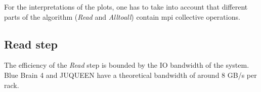 For the interpretations of the plots, one has to take into account that different parts of the algorithm
(\emph{Read} and \emph{Alltoall}) contain mpi collective operations.

\subsection{Read step}
\label{sec:speedup:load}
The efficiency of the \emph{Read} step is bounded by the IO bandwidth of the system.
Blue Brain 4 and JUQUEEN have a theoretical bandwidth of around $8$ GB/s per rack.

